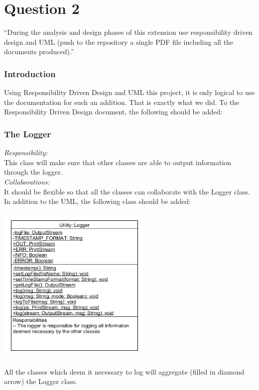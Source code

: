 \section{Question 2}

``During the analysis and design phases of this extension use responsibility driven design and UML
(push to the repository a single PDF file including all the documents produced).''

\subsubsection{Introduction}
Using Responsibility Driven Design and UML this project, it is only logical to use the documentation for such an addition. That is exactly what we did. To the Responsibility Driven Design document, the following should be added:

\subsubsection{The Logger}
\textit{Responsibility:}  \\
This class will make sure that other classes are able to output information through the logger. \\
\textit{Collaborations:} \\
It should be flexible so that all the classes can collaborate with the Logger class. \\

\noindent In addition to the UML, the following class should be added:

\includegraphics[width=75mm]{loggerUML.png}

\noindent All the classes which deem it necessary to log will aggregate (filled in diamond arrow) the Logger class.
